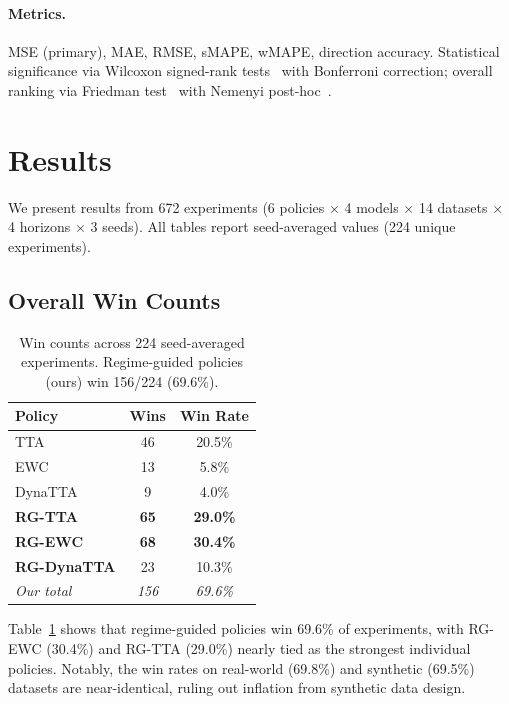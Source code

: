 \documentclass[journal]{IEEEtran}
\begin{document}
\paragraph{Metrics.} MSE (primary), MAE, RMSE, sMAPE, wMAPE, direction accuracy. Statistical significance via Wilcoxon signed-rank tests~\cite{wilcoxon1945} with Bonferroni correction; overall ranking via Friedman test~\cite{friedman1937} with Nemenyi post-hoc~\cite{demsar2006statistical}.


\section{Results}
\label{sec:results}

We present results from 672 experiments (6 policies $\times$ 4 models $\times$ 14 datasets $\times$ 4 horizons $\times$ 3 seeds). All tables report seed-averaged values (224 unique experiments).

\subsection{Overall Win Counts}

\begin{table}[t]
\centering
\caption{Win counts across 224 seed-averaged experiments. Regime-guided policies (ours) win 156/224 (69.6\%).}
\label{tab:wins}
\small
\begin{tabular}{lcc}
\toprule
Policy & Wins & Win Rate \\
\midrule
TTA & 46 & 20.5\% \\
EWC & 13 & 5.8\% \\
DynaTTA & 9 & 4.0\% \\
\midrule
\textbf{RG-TTA} & \textbf{65} & \textbf{29.0\%} \\
\textbf{RG-EWC} & \textbf{68} & \textbf{30.4\%} \\
\textbf{RG-DynaTTA} & 23 & 10.3\% \\
\midrule
\emph{Our total} & \emph{156} & \emph{69.6\%} \\
\bottomrule
\end{tabular}
\end{table}

Table~\ref{tab:wins} shows that regime-guided policies win 69.6\% of experiments, with RG-EWC (30.4\%) and RG-TTA (29.0\%) nearly tied as the strongest individual policies. Notably, the win rates on real-world (69.8\%) and synthetic (69.5\%) datasets are near-identical, ruling out inflation from synthetic data design.
\end{document}
